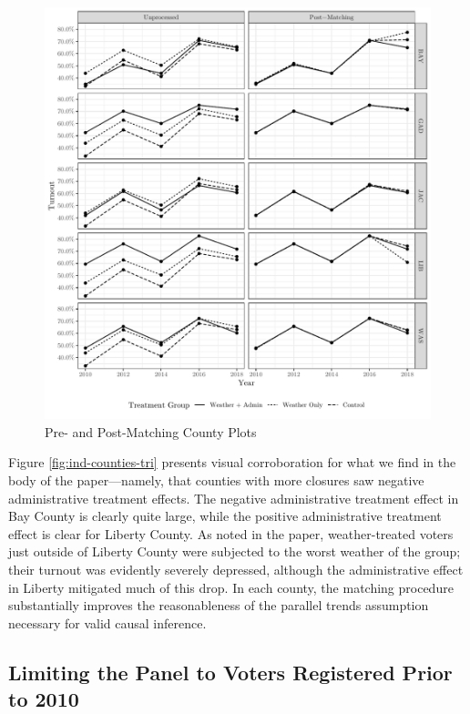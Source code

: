 \documentclass[
  12pt,
]{article}
\begin{document}
\begin{figure}[H]

{\centering \includegraphics{si_files/figure-latex/indcs-chunk-tr-1} 

}

\caption{\label{fig:ind-counties-tri}Pre- and Post-Matching County Plots}\label{fig:indcs-chunk-tr}
\end{figure}

Figure \ref{fig:ind-counties-tri} presents visual corroboration for what we find in the body of the paper---namely, that counties with more closures saw negative administrative treatment effects. The negative administrative treatment effect in Bay County is clearly quite large, while the positive administrative treatment effect is clear for Liberty County. As noted in the paper, weather-treated voters just outside of Liberty County were subjected to the worst weather of the group; their turnout was evidently severely depressed, although the administrative effect in Liberty mitigated much of this drop. In each county, the matching procedure substantially improves the reasonableness of the parallel trends assumption necessary for valid causal inference.

\hypertarget{limiting-the-panel-to-voters-registered-prior-to-2010}{%
\subsection*{Limiting the Panel to Voters Registered Prior to 2010}\label{limiting-the-panel-to-voters-registered-prior-to-2010}}
\end{document}
